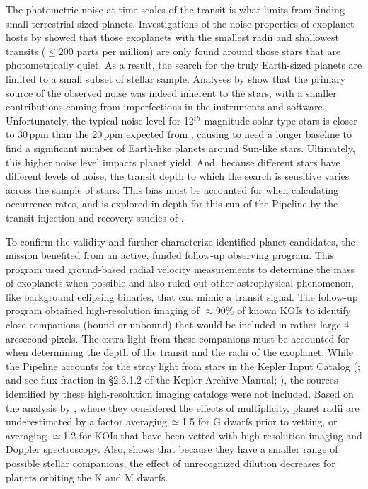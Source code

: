 {\color{blue}
The photometric noise at time scales of the transit is what limits \Kepler{} from finding small terrestrial-sized planets. Investigations of the noise properties of \Kepler{} exoplanet hosts by \citet{Howell2016} showed that those exoplanets with the smallest radii and shallowest transits ($\leq 200$ parts per million) are only found around those stars that are photometrically quiet. As a result, the search for the truly Earth-sized planets are limited to a small subset of  stellar sample.  Analyses by \citet{Gilliland2011,Gilliland2015} show that the primary source of the observed noise was indeed inherent to the stars, with a smaller contributions coming from imperfections in the instruments and software. Unfortunately, the typical noise level for 12$^{th}$ magnitude solar-type stars is closer to 30\,ppm \citep{Gilliland2015} than the 20\,ppm expected from \citet{Jenkins2002a}, causing \Kepler{} to need a longer baseline to find a significant number of Earth-like planets around Sun-like stars.   Ultimately, this higher noise level impacts  planet yield. And, because different stars have different levels of noise, the transit depth to which the search is sensitive varies across the sample of stars. This bias must be accounted for when calculating occurrence rates, and is explored in-depth for this run of the \Kepler{} Pipeline by the transit injection and recovery studies of \citet[][]{Burke2017b,Burke2017a,Christiansen2017}.
}
 

{\color{blue}
To confirm the validity and further characterize identified planet candidates, the \Kepler{} mission benefited from an active, funded follow-up observing program. This program used ground-based radial velocity measurements to determine the mass of exoplanets \citep[e.g.,][]{Marcy2014} when possible and also ruled out other astrophysical phenomenon, like background eclipsing binaries, that can mimic a transit signal.  The follow-up program obtained high-resolution imaging of $\approx$90\% of known KOIs \citep[e.g.,][]{Furlan2017} to identify close companions (bound or unbound) that would be included in  rather large 4 arcsecond pixels.  The extra light from these companions must be accounted for when determining the depth of the transit and the radii of the exoplanet.  While the \Kepler{} Pipeline accounts for the stray light from stars in the Kepler Input Catalog (\citealt{Brown2011}; and see flux fraction in \S2.3.1.2 of the Kepler Archive Manual; \citealt{Thompson2014}), the sources identified by these high-resolution imaging catalogs were not included. Based on the analysis by \citet{Ciardi2015}, where they considered the effects of multiplicity, planet radii are underestimated by a factor averaging\,$\simeq$1.5 for G dwarfs prior to vetting, or averaging $\simeq$1.2 for KOIs that have been vetted with high-resolution imaging and Doppler spectroscopy.  Also, \citet{Ciardi2015} shows that because they have a smaller range of possible stellar companions, the effect of unrecognized dilution decreases for planets orbiting the K and M dwarfs.
}

